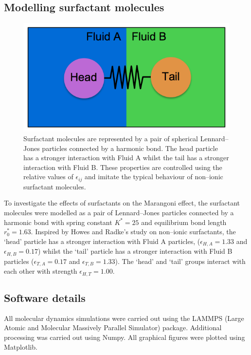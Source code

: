 \subsection{Modelling surfactant molecules}\label{ModellingSurfactants}
\begin{figure}[h]
\centering
\includegraphics[scale=0.4]{surfactant.png}
\caption{Surfactant molecules are represented by a pair of spherical Lennard--Jones particles connected by a harmonic bond. 
The head particle has a stronger interaction with Fluid A whilst the tail has a stronger interaction with Fluid B.
These properties are controlled using the relative values of $\epsilon_{ij}$ and imitate the typical behaviour of non--ionic surfactant molecules.
 }
\label{surfactant}
\end{figure}
To investigate the effects of surfactants on the Marangoni effect, the surfactant molecules were modelled as a pair of Lennard--Jones particles connected by a harmonic bond with spring constant $K^{*} = 25$ and equilibrium bond length $r^{*}_{0}=1.63$.
Inspired by Howes and Radke's study on non--ionic surfactants,\cite{HowesSurfactant} the `head' particle has a stronger interaction with Fluid A particles, ($\epsilon_{H, A} = 1.33$ and $\epsilon_{H, B} = 0.17$) whilst the `tail' particle has a stronger interaction with Fluid B particles ($\epsilon_{T, A} = 0.17$ and $\epsilon_{T, B} = 1.33$).
The `head' and `tail' groups interact with each other with strength $\epsilon_{H, T} = 1.00$.
\FloatBarrier

\subsection{Software details}\label{SoftwareDetails}
All molecular dynamics simulations were carried out using the LAMMPS (Large Atomic and Molecular Massively Parallel Simulator) package.\cite{LAMMPS}
Additional processing was carried out using Numpy.\cite{NumPy}
All graphical figures were plotted using Matplotlib.\cite{MatPlotLib}

